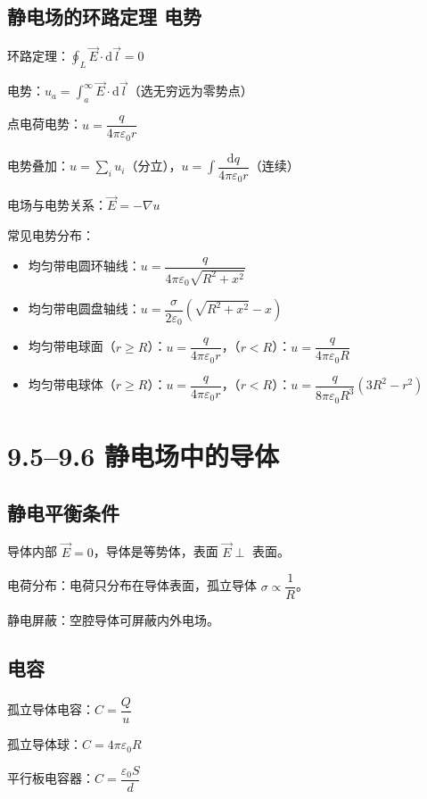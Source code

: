 \documentclass{ctexart}
\begin{document}
\subsection*{静电场的环路定理 电势}
环路定理：$\displaystyle\oint_L \vec{E}\cdot\mathrm{d}\vec{l} = 0$

电势：$u_a = \displaystyle\int_a^{\infty} \vec{E}\cdot\mathrm{d}\vec{l}$（选无穷远为零势点）

点电荷电势：$u = \dfrac{q}{4\pi\varepsilon_0 r}$

电势叠加：$u = \sum\limits_i u_i$（分立），$u = \displaystyle\int \dfrac{\mathrm{d}q}{4\pi\varepsilon_0 r}$（连续）

电场与电势关系：$\vec{E} = -\nabla u$

常见电势分布：
\begin{itemize}
  \item 均匀带电圆环轴线：$u = \dfrac{q}{4\pi\varepsilon_0\sqrt{R^{2}+x^{2}}}$
  \item 均匀带电圆盘轴线：$u = \dfrac{\sigma}{2\varepsilon_0}\left(\sqrt{R^{2}+x^{2}} - x\right)$
  \item 均匀带电球面（$r \ge R$）：$u = \dfrac{q}{4\pi\varepsilon_0 r}$，（$r < R$）：$u = \dfrac{q}{4\pi\varepsilon_0 R}$
  \item 均匀带电球体（$r \ge R$）：$u = \dfrac{q}{4\pi\varepsilon_0 r}$，（$r < R$）：$u = \dfrac{q}{8\pi\varepsilon_0 R^{3}}(3R^{2} - r^{2})$
\end{itemize}

\section*{9.5--9.6 静电场中的导体}

\subsection*{静电平衡条件}
导体内部 $\vec{E} = 0$，导体是等势体，表面 $\vec{E} \perp$ 表面。

电荷分布：电荷只分布在导体表面，孤立导体 $\sigma \propto \dfrac{1}{R}$。

静电屏蔽：空腔导体可屏蔽内外电场。

\subsection*{电容}
孤立导体电容：$C = \dfrac{Q}{u}$

孤立导体球：$C = 4\pi\varepsilon_0 R$

平行板电容器：$C = \dfrac{\varepsilon_0 S}{d}$
\end{document}
